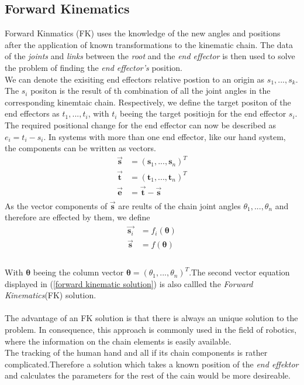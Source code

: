  \subsection{Forward Kinematics}Forward
 \label{Forward Kinematics}  Kinmatics (FK) uses the knowledge of the new angles and positions after the application of known transformations to the kinematic chain. The data of the \textit{joints} and \textit{links} between the \textit{root} and the \textit{end effector} is then used to solve the problem of finding the \textit{end effector's} position.\\
We can denote the exisiting end effectors relative postion to an origin as $ s_{1},...,s_{k}$. The $s_{i}$ positon is the result of th combination of all the joint angles in the corresponding kinemtaic chain. Respectively, we define the target positon of the end effectors as $t_{1},...,t_{i}$, with $t_{i}$ beeing the target positiojn for the end effector $s_{i}$. The required positional change for the end effector can now be described as $e_{i}=t_{i}-s_{i}$. In systems with more than one end effector, like our hand system, the components can be written as vectors.
\begin{equation}
\label{fk components}
\begin{split}
\vec{\textbf{s}}&=(\textbf{s}_{1},...,\textbf{s}_{n})^{T}\\
\vec{\textbf{t}}&=(\textbf{t}_{1},...,\textbf{t}_{n})^{T}\\
\vec{\textbf{e}}&= \vec{\textbf{t}}-\vec{\textbf{s}}\\
\end{split}
\end{equation}
As the vector components of $\vec{\textbf{s}}$ are reults of the chain joint angles $\theta_{1},...,\theta_{n}$ and therefore are effected by them, we define 
\begin{equation}
\label{forward kinematic solution}
\begin{split}
\vec{\textbf{s}_{i}}&=f_{i}(\pmb{\theta})\\
\vec{\textbf{s}}&=f(\pmb{\theta})\\
\end{split}
\end{equation}
\\With $\pmb{\theta}$ beeing the column vector $\pmb{\theta}=(\theta_{1},...,\theta_{n})^{T}$.The second vector equation displayed in (\ref{forward kinematic solution}) is also callled the \textit{Forward Kinematics}(FK) solution.\\
\\The advantage of an FK solution is that there is always an unique solution to the problem. In consequence, this approach is commonly used in the field of robotics, where the information on the chain elements is easily available.\\
The tracking of the human hand and all if its chain components is rather complicated.Therefore a solution which takes a known position of the \textit{end effektor} and calculates the parameters for the rest of the cain would be more desireable.\\

